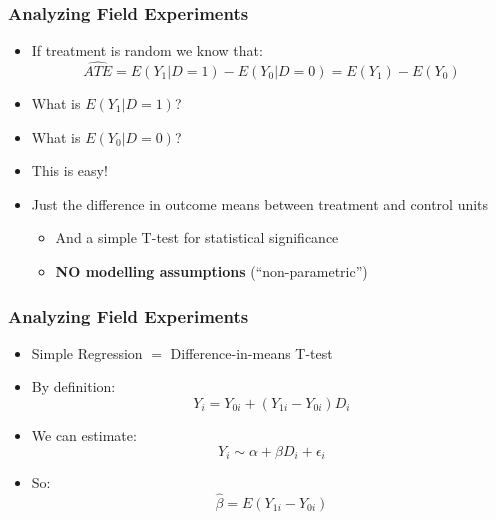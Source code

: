 \documentclass[xcolor=x11names,compress]{beamer}\usepackage[]{graphicx}\usepackage[]{color}
\renewcommand{\(}{\begin{columns}}
\renewcommand{\)}{\end{columns}}
\newcommand{\<}[1]{\begin{column}{#1}}
\renewcommand{\>}{\end{column}}
\begin{document}
\begin{frame}
\frametitle{Analyzing Field Experiments}
\begin{itemize}
\item If treatment is random we know that:
$$\hat{ATE} = E(Y_1|D=1) - E(Y_0|D=0) = E(Y_1) - E(Y_0) $$
\pause
\item What is $E(Y_1|D=1)$? 
\pause 
\item What is $E(Y_0|D=0)$?
\pause
\item This is easy! 
\pause
\item Just the difference in outcome means between treatment and control units
\pause
\begin{itemize}
\item And a simple T-test for statistical significance
\pause
\item \textbf{NO modelling assumptions} (``non-parametric'')
\end{itemize}
\end{itemize}
\end{frame}

\begin{frame}
\frametitle{Analyzing Field Experiments}
\begin{itemize}
\item Simple Regression $=$ Difference-in-means T-test
\pause
\item By definition: 
$$Y_i = Y_{0i} + (Y_{1i} - Y_{0i}) D_i$$
\pause
\item We can estimate:
$$Y_i \sim \alpha + \beta D_i + \epsilon_i$$
\pause
\item So:
$$\hat{\beta} = E(Y_{1i} - Y_{0i})$$
\end{itemize}
\end{frame}
\end{document}
